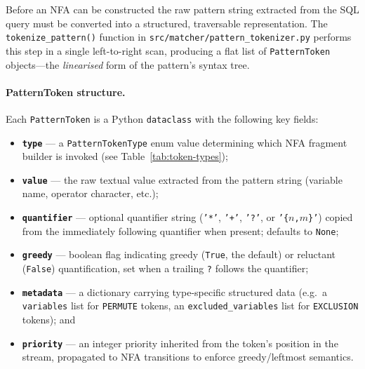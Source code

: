 Before an NFA can be constructed the raw pattern string extracted
from the SQL query must be converted into a structured, traversable
representation.  The \texttt{tokenize\_pattern()} function in
\texttt{src/matcher/pattern\_tokenizer.py} performs this step in a
single left-to-right scan, producing a flat list of
\texttt{PatternToken} objects—the \emph{linearised} form of the
pattern's syntax tree.

\paragraph{PatternToken structure.}
Each \texttt{PatternToken} is a Python \texttt{dataclass} with the
following key fields:

\begin{itemize}
  \item \textbf{\texttt{type}} — a \texttt{PatternTokenType} enum
    value determining which NFA fragment builder is invoked
    (see Table~\ref{tab:token-types});
  \item \textbf{\texttt{value}} — the raw textual value extracted
    from the pattern string (variable name, operator character, etc.);
  \item \textbf{\texttt{quantifier}} — optional quantifier string
    (\texttt{'*'}, \texttt{'+'}, \texttt{'?'}, or
    \texttt{'\{$n$,$m$\}'}) copied from the immediately following
    quantifier when present; defaults to \texttt{None};
  \item \textbf{\texttt{greedy}} — boolean flag indicating greedy
    (\texttt{True}, the default) or reluctant (\texttt{False})
    quantification, set when a trailing \texttt{?} follows the
    quantifier;
  \item \textbf{\texttt{metadata}} — a dictionary carrying
    type-specific structured data (e.g.\ a \texttt{variables} list
    for \texttt{PERMUTE} tokens, an \texttt{excluded\_variables}
    list for \texttt{EXCLUSION} tokens); and
  \item \textbf{\texttt{priority}} — an integer priority inherited
    from the token's position in the stream, propagated to NFA
    transitions to enforce greedy/leftmost semantics.
\end{itemize}


